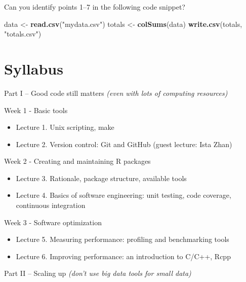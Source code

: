 \documentclass[]{book}
\newenvironment{Shaded}{\begin{snugshade}}{\end{snugshade}}
\newcommand{\KeywordTok}[1]{\textcolor[rgb]{0.13,0.29,0.53}{\textbf{#1}}}
\newcommand{\StringTok}[1]{\textcolor[rgb]{0.31,0.60,0.02}{#1}}
\newcommand{\NormalTok}[1]{#1}
\providecommand{\tightlist}{%
  \setlength{\itemsep}{0pt}\setlength{\parskip}{0pt}}
\theoremstyle{definition}
\theoremstyle{definition}
\theoremstyle{definition}
\theoremstyle{remark}
\let\BeginKnitrBlock\begin \let\EndKnitrBlock\end
\begin{document}
\BeginKnitrBlock{exercise}
\protect\hypertarget{exr:unnamed-chunk-1}{}{\label{exr:unnamed-chunk-1} }Can
you identify points 1--7 in the following code snippet?
\EndKnitrBlock{exercise}

\begin{Shaded}
\begin{Highlighting}[]
\NormalTok{data <-}\StringTok{ }\KeywordTok{read.csv}\NormalTok{(}\StringTok{"mydata.csv"}\NormalTok{)}
\NormalTok{totals <-}\StringTok{ }\KeywordTok{colSums}\NormalTok{(data)}
\KeywordTok{write.csv}\NormalTok{(totals, }\StringTok{"totals.csv"}\NormalTok{)}
\end{Highlighting}
\end{Shaded}

\section{Syllabus}\label{syllabus}

Part I -- Good code still matters \emph{(even with lots of computing
resources)}

Week 1 - Basic tools

\begin{itemize}
\tightlist
\item
  Lecture 1. Unix scripting, make
\item
  Lecture 2. Version control: Git and GitHub (guest lecture: Ista Zhan)
\end{itemize}

Week 2 - Creating and maintaining R packages

\begin{itemize}
\tightlist
\item
  Lecture 3. Rationale, package structure, available tools
\item
  Lecture 4. Basics of software engineering: unit testing, code
  coverage, continuous integration
\end{itemize}

Week 3 - Software optimization

\begin{itemize}
\tightlist
\item
  Lecture 5. Measuring performance: profiling and benchmarking tools
\item
  Lecture 6. Improving performance: an introduction to C/C++, Rcpp
\end{itemize}

Part II -- Scaling up \emph{(don't use big data tools for small data)}
\end{document}
